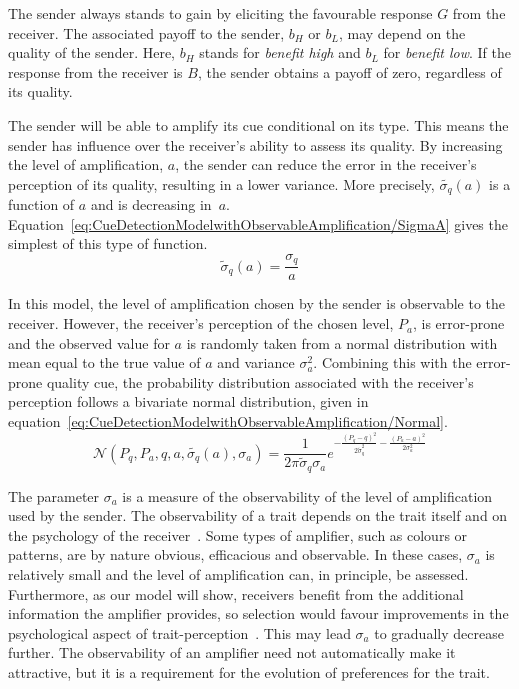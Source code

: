 \documentclass[a4paper,12pt]{article}
\numberwithin{equation}{section}
\numberwithin{figure}{section}
\begin{document}
The sender always stands to gain by eliciting the favourable response $G$ from the receiver. The associated payoff to the sender, $b_{H}$ or $b_{L}$, may depend on the quality of the sender. Here, $b_{H}$ stands for \textit{benefit high} and $b_{L}$ for \textit{benefit low}. If the response from the receiver is $B$, the sender obtains a payoff of zero, regardless of its quality.

The sender will be able to amplify its cue conditional on its type. This means the sender has influence over the receiver's ability to assess its quality. By increasing the level of amplification, $a$, the sender can reduce the error in the receiver's perception of its quality, resulting in a lower variance. More precisely, $\tilde{\sigma_{q}}(a)$ is a function of $a$ and is decreasing in~$a$. Equation~\ref{eq:CueDetectionModelwithObservableAmplification/SigmaA} gives the simplest of this type of function.
\begin{equation}
\label{eq:CueDetectionModelwithObservableAmplification/SigmaA}
\tilde{\sigma}_{q}(a)=\frac{\sigma_{q}}{a}
\end{equation}

In this model, the level of amplification chosen by the sender is observable to the receiver. However, the receiver's perception of the chosen level, $P_{a}$, is error-prone and the observed value for $a$ is randomly taken from a normal distribution with mean equal to the true value of $a$ and variance $\sigma^{2}_{a}$. Combining this with the error-prone quality cue, the probability distribution associated with the receiver's perception follows a bivariate normal distribution, given in equation~\ref{eq:CueDetectionModelwithObservableAmplification/Normal}.
\begin{equation}
\label{eq:CueDetectionModelwithObservableAmplification/Normal}
\mathcal{N}(P_{q}, P_{a}, q, a, \tilde{\sigma_{q}}(a), \sigma_{a}) = \frac{1}{2 \pi \tilde{\sigma}_{q} \sigma_{a}} e^{-\frac{(P_{q}-q)^2}{2 \tilde{\sigma}_{q}^2}-\frac{(P_{a}-a)^2}{2 \sigma_{a}^2}}
\end{equation}

The parameter $\sigma_{a}$ is a measure of the observability of the level of amplification used by the sender. The observability of a trait depends on the trait itself and on the psychology of the receiver~\cite{Guilford1991}. Some types of amplifier, such as colours or patterns, are by nature obvious, efficacious and observable. In these cases, $\sigma_a$ is relatively small and the level of amplification can, in principle, be assessed. Furthermore, as our model will show, receivers benefit from the additional information the amplifier provides, so selection would favour improvements in the psychological aspect of trait-perception~\cite{Gualla2008}. This may lead $\sigma_a$ to gradually decrease further. The observability of an amplifier need not automatically make it attractive, but it is a requirement for the evolution of preferences for the trait.
 
\end{document}
